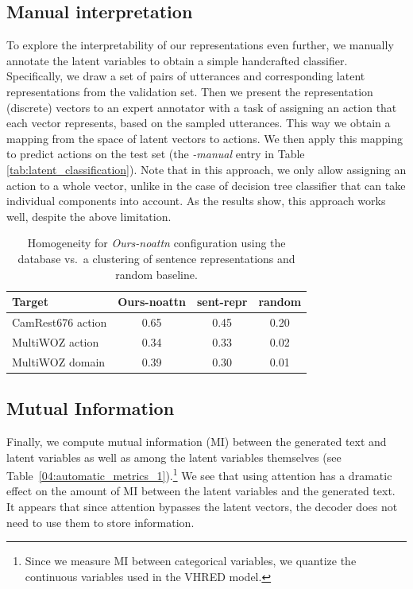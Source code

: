 \subsection{Manual interpretation}
\label{sec:manual}
To explore the interpretability of our representations even further, we manually annotate the latent variables to obtain a simple handcrafted classifier.
Specifically, we draw a set of pairs of utterances and corresponding latent representations from the validation set.
Then we present the representation (discrete) vectors to an expert annotator with a task of assigning an action that each vector represents, based on the sampled utterances.
This way we obtain a mapping from the space of latent vectors to actions.
We then apply this mapping to predict actions on the test set (the \textit{-manual} entry in Table \ref{tab:latent_classification}).
Note that in this approach, we only allow assigning an action to a whole vector, unlike in the case of decision tree classifier that can take individual components into account.
As the results show, this approach works well, despite the above limitation.

\begin{table}[t]
    \centering\small
    \begin{tabular}{l|c|c|c}
      \toprule
      \textbf{Target} & Ours-noattn & sent-repr & random \\
      \midrule
      CamRest676 action & 0.65 & 0.45 & 0.20\\
      MultiWOZ action & 0.34 & 0.33 & 0.02\\
      MultiWOZ domain & 0.39 & 0.30 & 0.01 \\
      \bottomrule
  \end{tabular}
  \caption{Homogeneity for \emph{Ours-noattn} configuration using the database vs.~a clustering of sentence representations and random baseline.}
  \label{tab:homo}
\end{table}

\subsection{Mutual Information}
Finally, we compute mutual information (MI) between the generated text and latent variables as well as among the latent variables themselves (see Table~\ref{04:automatic_metrics_1}).\footnote{
Since we measure MI between categorical variables, we quantize the continuous variables used in the VHRED model.}
We see that using attention has a dramatic effect on the amount of MI between the latent variables and the generated text. %
It appears that since attention bypasses the latent vectors, the decoder does not need to use them to store information.
